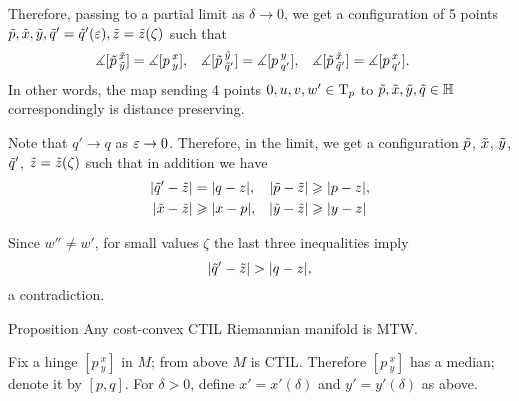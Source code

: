 Therefore, passing to a partial limit as $\delta\to0$, we get a configuration of 5 points 
$\~p, \~x,\~y,\~q'=\~q'(\eps),\~z=\~z(\zeta)$ such that  
\begin{align*}
\measuredangle[\~p\,^{\~x}_{\~y}]&= \measuredangle[p\,^{x}_{y}],
&
\measuredangle[\~p\,^{\~y}_{\~q'}]&= \measuredangle[p\,^{y}_{q'}],
&
\measuredangle[\~p\,^{\~x}_{\~q'}]&= \measuredangle[p\,^{x}_{q'}].
\end{align*}
In other words, the map sending 4 points $0,u,v,w'\in\T_p$ to $\~p,\~x,\~y,\~q\in\HH$ correspondingly is distance preserving.

Note that $q'\to q$ as $\eps\to0$. 
Therefore, in the limit,
we get a configuration $\~p$, $\~x$, $\~y$, $\~q'$, $\~z=\~z(\zeta)$ such that in addition we have
\begin{align*}
|\~q'-\~z|&=|q-z|,
&
|\~p-\~z|&\ge |p-z|,
\\
|\~x-\~z|&\ge |x-p|,
&
|\~y-\~z|&\ge |y-z|
\end{align*}

Since $w''\ne w'$, for small values $\zeta$ the last three inequalities 
imply 
\[|\~q'-\~z|>|q-z|,\]
a contradiction.


\begin{thm}{Proposition}\label{prop:CTIL}
Any cost-convex CTIL Riemannian manifold is MTW.
\end{thm}


Fix a hinge $[p\,^x_y]$ in $M$; from above $M$ is CTIL.
Therefore $[p\,^x_y]$ has a median; denote it by $[p,q]$.
For $\delta>0$, define $x'=x'(\delta)$ and $y'=y'(\delta)$ as above.

\hide
\begin{wrapfigure}{r}{35 mm}
\end{wrapfigure}
\unhide

